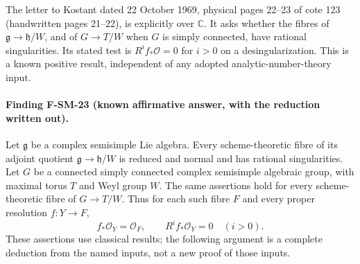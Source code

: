 \documentclass[11pt,a4paper]{article}
\theoremstyle{definition}\newtheorem{definition}[theorem]{Definition}
\theoremstyle{remark}\newtheorem{remark}[theorem]{Remark}
\begin{document}
The letter to Kostant dated 22 October 1969, physical pages 22--23
of cote 123 (handwritten pages 21--22), is explicitly over
$\mathbb C$.  It asks whether the fibres of
$\mathfrak g\to\mathfrak h/W$, and of $G\to T/W$ when $G$ is
simply connected, have rational singularities.  Its stated test is
$R^if_*\mathcal O=0$ for $i>0$ on a desingularization.
This is a known positive result, independent of any adopted
analytic-number-theory input.

\paragraph{Finding F-SM-23 (known affirmative answer, with the reduction written out).}
Let $\mathfrak g$ be a complex semisimple Lie algebra.
Every scheme-theoretic fibre of its adjoint quotient
$\mathfrak g\to\mathfrak h/W$ is reduced and normal and has
rational singularities.  Let $G$ be a connected simply connected
complex semisimple algebraic group, with maximal torus $T$ and Weyl
group $W$.  The same assertions hold for every scheme-theoretic
fibre of $G\to T/W$.
Thus for each such fibre $F$ and every proper resolution
$f:Y\to F$,
\[
 f_*\mathcal O_Y=\mathcal O_F,\qquad
 R^if_*\mathcal O_Y=0\quad(i>0).
\]
These assertions use classical results; the following argument is a
complete deduction from the named inputs, not a new proof of those
inputs.
\end{document}
